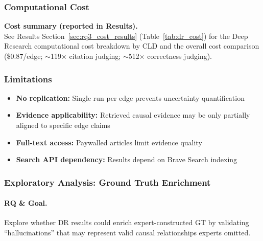 \subsubsection{Computational Cost}

\noindent\textbf{Cost summary (reported in Results).}\\
See Results Section~\ref{sec:rq3_cost_results} (Table~\ref{tab:dr_cost}) for the Deep Research computational cost breakdown by CLD and the overall cost comparison (\$0.87/edge; $\sim$119$\times$ citation judging; $\sim$512$\times$ correctness judging).

\subsubsection{Limitations}

\begin{itemize}[noitemsep]
    \item \textbf{No replication:} Single run per edge prevents uncertainty quantification
    \item \textbf{Evidence applicability:} Retrieved causal evidence may be only partially aligned to specific edge claims
    \item \textbf{Full-text access:} Paywalled articles limit evidence quality
    \item \textbf{Search API dependency:} Results depend on Brave Search indexing
\end{itemize}

\subsubsection{Exploratory Analysis: Ground Truth Enrichment}
\label{sec:gt_enrichment_method}

\paragraph{RQ \& Goal.}
Explore whether DR results could enrich expert-constructed GT by validating ``hallucinations'' that may represent valid causal relationships experts omitted.

